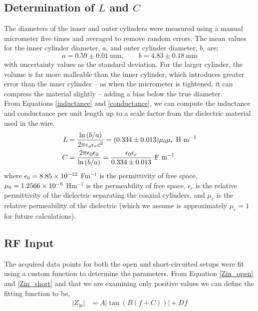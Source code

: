 \subsection{Determination of $L$ and $C$}
The diameters of the inner and outer cylinders were measured using a manual micrometer five times and averaged to remove random errors. The mean values for the inner cylinder diameter, $a$, and outer cylinder diameter, $b$, are;
\[ a = 0.59 \pm 0.01 \ \text{mm}, \quad\quad b = 4.83 \pm 0.18 \ \text{mm} \]
with uncertainty values as the standard deviation. For the larger cylinder, the volume is far more malleable than the inner cylinder, which introduces greater error than the inner cylinder -- as when the micrometer is tightened, it can compress the material slightly -- adding a bias below the true diameter. \\ 

From Equations \ref{inductance} and \ref{conductance}, we can compute the inductance and conductance per unit length up to a scale factor from the dielectric material used in the wire.
\begin{align*}
    L &= \frac{ \ln \left( b \middle/ a \right) }{2 \pi \epsilon_o \epsilon_r c^2} = (0.334 \pm 0.013)\mu_0\mu_r \ \text{H m$^{-1}$} \\
    C &= \frac{2 \pi \epsilon_0\epsilon_0}{\ln \left( b \middle/ a \right) } = \frac{\epsilon_0\epsilon_r}{0.334 \pm 0.013} \ \text{F m$^{-1}$} 
\end{align*}
where $\epsilon_0 = 8.85\times10^{-12} $ Fm$^{-1}$ is the permittivity of free space, $\mu_0 = 1.2566\times10^{-6}$ Hm$^{-1}$ is the permeability of free space, $\epsilon_r$ is the relative permittivity of the dielectric separating the coaxial cylinders, and $\mu_r$ is the relative permeability of the dielectric (which we assume is approximately $\mu_r=1$ for future calculations).\\

\subsection{RF Input}

The acquired data points for both the open and short-circuited setups were fit using a custom function to determine the parameters. From Equation \ref{Zin_open} and \ref{Zin_short} and that we are examining only positive values we can define the fitting function to be,
\begin{align}
    |Z_\text{in}| &= A | \tan\left( B(f + C) \right)| + D f 
\end{align}

